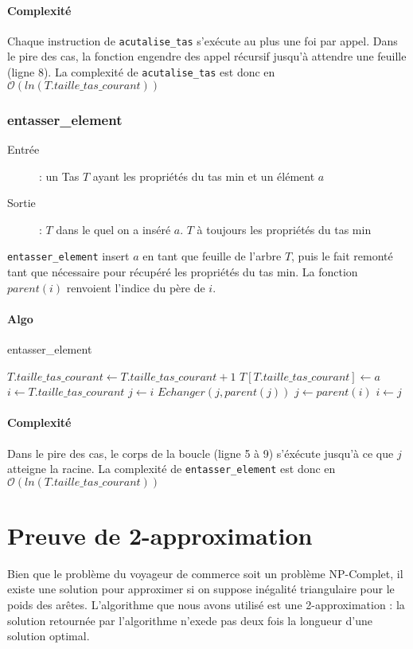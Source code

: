 \documentclass[a4paper,11pt]{article}
\begin{document}
\paragraph*{Complexité}
Chaque instruction de \texttt{acutalise\_tas} s’exécute au plus une foi par appel. Dans le pire des cas, la fonction engendre des appel récursif jusqu’à attendre une feuille (ligne 8). La complexité de \texttt{acutalise\_tas} est donc en $\mathcal{O}(ln(T.taille\_tas\_courant))$
\subsubsection*{entasser\_element}
\begin{description}
\item[Entrée] :  un \textsf{Tas} $T$ ayant les propriétés du tas min et un élément $a$
\item[Sortie] :  $T$ dans le quel on a inséré $a$. $T$ à toujours les propriétés du tas min
\end{description}
\texttt{entasser\_element} insert $a$ en tant que feuille de l'arbre $T$, puis le fait remonté tant que nécessaire pour récupéré les propriétés du tas min.
La fonction $parent(i)$ renvoient l'indice du père de $i$.
\paragraph*{Algo}
\begin{algorithm}
\caption{entasser\_element}
\begin{algorithmic}[1]
\STATE $T.taille\_tas\_courant \leftarrow T.taille\_tas\_courant + 1$
\STATE $T\left[T.taille\_tas\_courant\right] \leftarrow a$
\STATE $i \leftarrow T.taille\_tas\_courant$
\STATE $j \leftarrow i$
\STATE $Echanger(j, parent(j))$
\STATE $j \leftarrow parent(i)$
\STATE $i \leftarrow j$
\ENDWHILE
\end{algorithmic}
\end{algorithm}
\paragraph*{Complexité}
Dans le pire des cas, le corps de la boucle (ligne 5 à 9) s'éxécute jusqu'à ce que $j$ atteigne la racine. La complexité de \texttt{entasser\_element} est donc en $\mathcal{O}(ln(T.taille\_tas\_courant))$


\section{Preuve de 2-approximation} %
Bien que le problème du voyageur de commerce soit un problème NP-Complet, il existe une solution pour approximer si on suppose inégalité triangulaire pour le poids des arêtes. L'algorithme que nous avons utilisé est une 2-approximation : la solution retournée par l'algorithme n'exede pas deux fois la longueur d'une solution optimal.
\end{document}
